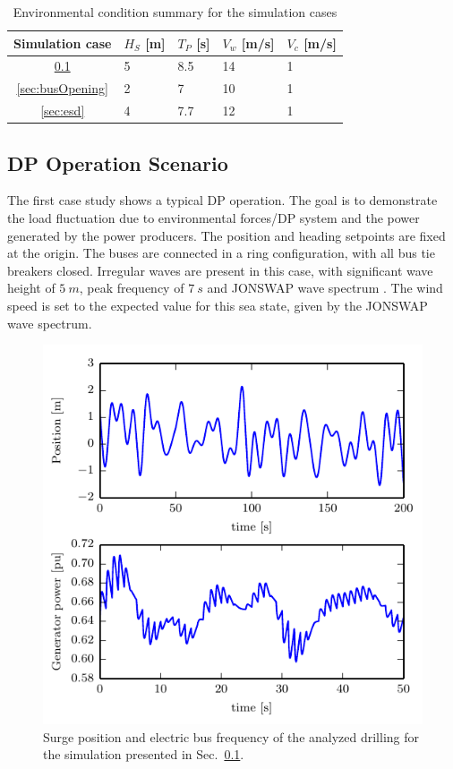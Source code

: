 \documentclass[journal]{IEEEtran}
\newcommand\T{\rule{0pt}{2.6ex}}       %
\newcommand\B{\rule[-1.2ex]{0pt}{0pt}} %
\begin{document}
\begin{table}[!htb]
	\caption{Environmental condition summary for the simulation cases}	
	\label{tab:simSummary}
	\begin{center}
	\begin{tabularx}{\columnwidth}{ cYYYY } \hline
		Simulation case & $H_S$ [m] & $T_P$ [s] & $V_w$ [m/s] & $V_c$ [m/s] \T\B \\
		\hline \T
		\ref{sec:DPScenario} 	&  5 & 8.5  & 14 & 1 \\
		\ref{sec:busOpening} 	&  2 & 7    & 10 & 1 \\
		\ref{sec:esd} 			&  4 & 7.7  & 12\B & 1 \\ \hline
	\end{tabularx}
	\end{center}
\end{table}

\subsection{DP Operation Scenario}
\label{sec:DPScenario}
The first case study shows a typical DP operation. The goal is to demonstrate the load fluctuation due to environmental forces/DP system and the power generated by the power producers. The position and heading setpoints are fixed at the origin. The buses are connected in a ring configuration, with all bus tie breakers closed. 
Irregular waves are present in this case, with significant wave height of $5~m$, peak frequency of $7~s$ and JONSWAP wave spectrum \cite{Myrhaug2000}. 
The wind speed is set to the expected value for this sea state, given by the JONSWAP wave spectrum.


\begin{figure}
\includegraphics[width=\columnwidth]{figures/dpIrregular}
\caption{Surge position and electric bus frequency of the analyzed drilling for the simulation presented in Sec.~\ref{sec:DPScenario}.}
\label{fig:DPIrregular}
\end{figure}
\end{document}
